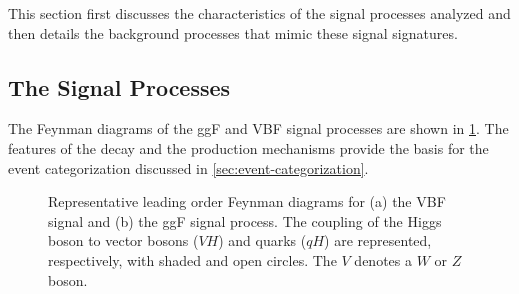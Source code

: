 This section first discusses the characteristics of the signal processes analyzed and then details the background processes that mimic these signal signatures.

\subsection{The Signal Processes}
\label{subsec:signal-bkg-characterisation}
The Feynman diagrams of the ggF and VBF signal processes are shown in \cref{fig:feyn:sig-wwprod}.
The features of the \HWWdet decay and the production mechanisms provide the basis for the event categorization discussed in \cref{sec:event-categorization}. 

\begin{figure}[t]
    \caption{Representative leading order Feynman diagrams for (a) the VBF signal and (b) the ggF signal process. The coupling of the Higgs boson to vector bosons ($VH$) and quarks ($qH$) are represented, respectively, with shaded and open circles. The $V$ denotes a $W$ or $Z$ boson.} 
    \label{fig:feyn:sig-wwprod}
\end{figure}


